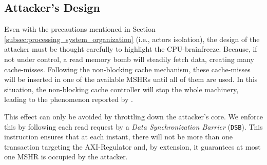%
%

    \subsection{Attacker's Design}
        \label{subsec:attacker_design}

        Even with the precautions mentioned in Section \ref{subsec:processing_system_organization} (i.e., actors isolation), the design of the attacker must be thought carefully to highlight the CPU-brainfreeze. %
        Because, if not under control, a read memory bomb will steadily fetch data, creating many cache-misses.
        Following the non-blocking cache mechanism, these cache-misses will be inserted in one of the available MSHRs until all of them are used.
        In this situation, the non-blocking cache controller will stop the whole machinery, leading to the phenomenon reported by \cite{Valsan2017AddressingIC}.

        This effect can only be avoided by throttling down the attacker's core.
        We enforce this by following each read request by a \emph{Data Synchronization Barrier} (\texttt{DSB}).
        This instruction ensures that at each instant, there will not be more than one transaction targeting the AXI-Regulator and, by extension, it guarantees at most one MSHR is occupied by the attacker.

